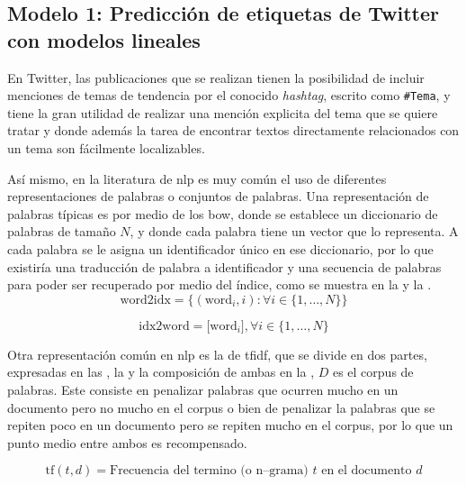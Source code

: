 
\subsection{Modelo 1: Predicción de etiquetas de Twitter con modelos lineales} \label{sec:twitter-prediction}
En Twitter, las publicaciones que se realizan tienen la posibilidad de incluir menciones de temas de tendencia por el conocido \emph{hashtag}, escrito como \texttt{\#Tema}, y tiene la gran utilidad de realizar una mención explicita del tema que se quiere tratar y donde además la tarea de encontrar textos directamente relacionados con un tema son fácilmente localizables.

Así mismo, en la literatura de \gls{nlp} es muy común el uso de diferentes representaciones de palabras o conjuntos de palabras. Una representación de palabras típicas es por medio de los \gls{bow}, donde se establece un diccionario de palabras de tamaño $N$, y donde cada palabra tiene un vector que lo representa. A cada palabra se le asigna un identificador único en ese diccionario, por lo que existiría una traducción de palabra a identificador y una secuencia de palabras para poder ser recuperado por medio del índice, como se muestra en la  y la .
\begin{equation} \label{eq:bow-repr1}
  \text{word2idx} = \Big\{(\text{word}_i, i) : \forall i \in \{1, \ldots, N\} \Big\}
\end{equation}

\begin{equation} \label{eq:bow-repr2}
  \text{idx2word} = \Big[\text{word}_i\Big], \forall i \in \{1, \ldots, N\}
\end{equation}

Otra representación común en \gls{nlp} es la de \gls{tfidf}, que se divide en dos partes, expresadas en las , la  y la composición de ambas en la , $D$ es el corpus de palabras. Este consiste en penalizar palabras que ocurren mucho en un documento pero no mucho en el corpus o bien de penalizar la palabras que se repiten poco en un documento pero se repiten mucho en el corpus, por lo que un punto medio entre ambos es recompensado.

\begin{equation} \label{eq:tf-repr}
  \text{tf}(t,d) = \text{Frecuencia del termino (o n--grama) } t \text{ en el documento } d
\end{equation}

